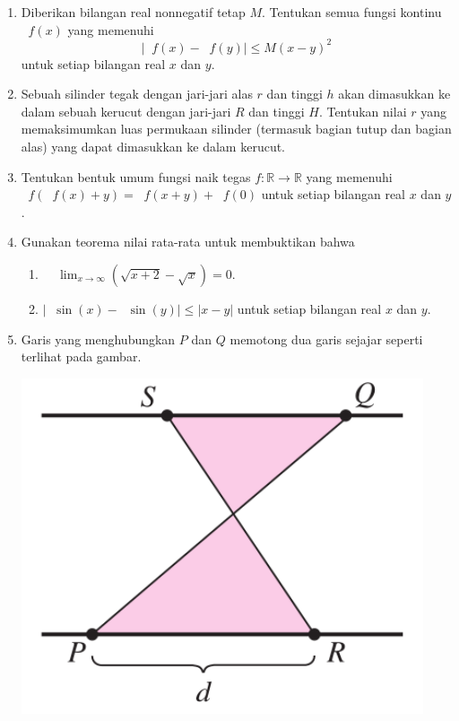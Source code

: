 \documentclass[12pt]{article}
\newcommand*\func[2]{\mathop{}\!{#1}{\left({#2}\right)}}
\newcommand*\ds[1]{\mathop{}\!\displaystyle{{#1}}}
\begin{document}
\begin{enumerate}[leftmargin=*]
\begin{enumerate}
		\end{enumerate}
		\item Diberikan bilangan real nonnegatif tetap $ M $. Tentukan semua fungsi kontinu $ \func{f}{x} $ yang memenuhi
		\[ \left|\func{f}{x} - \func{f}{y}\right| \leq M\left(x - y\right)^{2} \]
		untuk setiap bilangan real $ x $ dan $ y $.
		\item Sebuah silinder tegak dengan jari-jari alas $ r $ dan tinggi $ h $ akan dimasukkan ke dalam sebuah kerucut dengan jari-jari $ R $ dan tinggi $ H $. Tentukan nilai $ r $ yang memaksimumkan luas permukaan silinder (termasuk bagian tutup dan bagian alas) yang dapat dimasukkan ke dalam kerucut.
		\item Tentukan bentuk umum fungsi naik tegas $ f : \mathbb{R} \to \mathbb{R} $ yang memenuhi $ \func{f}{\func{f}{x} + y} = \func{f}{x + y} + \func{f}{0} $ untuk setiap bilangan real $ x $ dan $ y $.
		\item Gunakan teorema nilai rata-rata untuk membuktikan bahwa
		\begin{enumerate}
			\item $ \ds{\func{\lim_{x \to \infty}}{\sqrt{x + 2} - \sqrt{x}}} = 0 $.
			\item $ \left|\func{\sin}{x} - \func{\sin}{y}\right| \leq \left|x - y\right| $ untuk setiap bilangan real $ x $ dan $ y $.
		\end{enumerate}
		\item Garis yang menghubungkan $ P $ dan $ Q $ memotong dua garis sejajar seperti terlihat pada gambar.
		\begin{center}
			\includegraphics[scale=0.3]{pict1.PNG}
		\end{center}

\end{enumerate}
\end{document}
